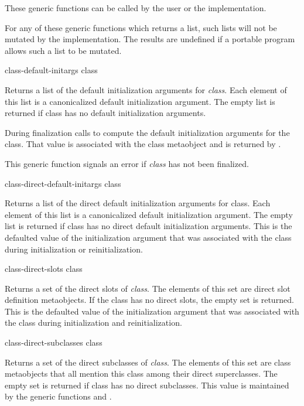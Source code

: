 These generic functions can be called by the user or the implementation.

For any of these generic functions which returns a list, such lists will not be
mutated by the implementation. The results are undefined if a portable program
allows such a list to be mutated.

\begin{defun}
class-default-initargs class

Returns a list of the default initialization arguments for \emph{class}. Each
element of this list is a canonicalized default initialization argument. The
empty list is returned if class has no default initialization arguments.

During finalization  calls
 to compute the default initialization arguments
for the class. That value is associated with the class metaobject and is
returned by .

This generic function signals an error if \emph{class} has not been finalized.
\end{defun}

\begin{defun}
class-direct-default-initargs class

Returns a list of the direct default initialization arguments for class. Each
element of this list is a canonicalized default initialization argument. The
empty list is returned if class has no direct default initialization
arguments. This is the defaulted value of the 
initialization argument that was associated with the class during initialization
or reinitialization.
\end{defun}

\begin{defun}
class-direct-slots class

Returns a set of the direct slots of \emph{class}. The elements of this set are direct
slot definition metaobjects. If the class has no direct slots, the empty set is
returned. This is the defaulted value of the  initialization
argument that was associated with the class during initialization and
reinitialization.
\end{defun}

\begin{defun}
class-direct-subclasses class

Returns a set of the direct subclasses of \emph{class}. The elements of this set are
class metaobjects that all mention this class among their direct
superclasses. The empty set is returned if class has no direct subclasses. This
value is maintained by the generic functions  and
.
\end{defun}

